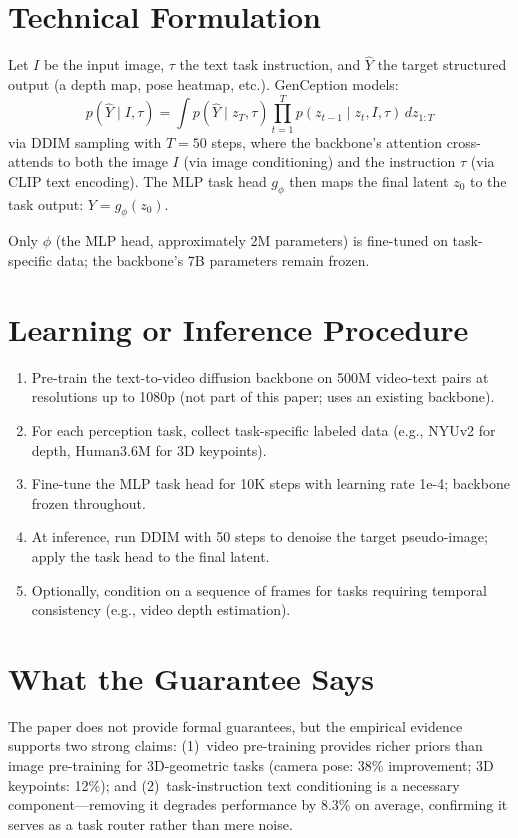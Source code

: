\documentclass[10pt,twocolumn]{article}
\begin{document}
\section{Technical Formulation}

Let $I$ be the input image, $\tau$ the text task instruction, and
$\hat{Y}$ the target structured output (a depth map, pose heatmap,
etc.). GenCeption models:
\[
p(\hat{Y} \mid I, \tau) = \int p(\hat{Y} \mid z_T, \tau)
  \prod_{t=1}^{T} p(z_{t-1} \mid z_t, I, \tau)\, dz_{1:T}
\]
via DDIM sampling with $T = 50$ steps, where the backbone's attention
cross-attends to both the image $I$ (via image conditioning) and the
instruction $\tau$ (via CLIP text encoding). The MLP task head $g_\phi$
then maps the final latent $z_0$ to the task output:
$Y = g_\phi(z_0)$.

Only $\phi$ (the MLP head, approximately 2M parameters) is fine-tuned
on task-specific data; the backbone's 7B parameters remain frozen.

\section{Learning or Inference Procedure}

\begin{enumerate}[itemsep=2pt,parsep=0pt]
  \item Pre-train the text-to-video diffusion backbone on 500M
    video-text pairs at resolutions up to 1080p (not part of this
    paper; uses an existing backbone).
  \item For each perception task, collect task-specific labeled data
    (e.g., NYUv2 for depth, Human3.6M for 3D keypoints).
  \item Fine-tune the MLP task head for 10K steps with learning rate
    1e-4; backbone frozen throughout.
  \item At inference, run DDIM with 50 steps to denoise the target
    pseudo-image; apply the task head to the final latent.
  \item Optionally, condition on a sequence of frames for tasks
    requiring temporal consistency (e.g., video depth estimation).
\end{enumerate}

\section{What the Guarantee Says}

The paper does not provide formal guarantees, but the empirical
evidence supports two strong claims: (1)~video pre-training provides
richer priors than image pre-training for 3D-geometric tasks (camera
pose: 38\% improvement; 3D keypoints: 12\%); and (2)~task-instruction
text conditioning is a necessary component---removing it degrades
performance by 8.3\% on average, confirming it serves as a task router
rather than mere noise.
\end{document}
